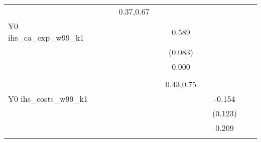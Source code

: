 \begin{table}[!h]
\begin{adjustbox}{width=\columnwidth,center}
\begin{tabular}{l*{8}{c}}
                    &                     &                     &   0.37,0.67         &                     &                     &                     &                     &                     &                     &                     \\
Y0 ihs\_ca\_exp\_w99\_k1&                     &                     &                     &                     &       0.589\sym{***}&                     &                     &                     &                     &                     \\
                    &                     &                     &                     &                     &     (0.083)         &                     &                     &                     &                     &                     \\
                    &                     &                     &                     &                     &       0.000         &                     &                     &                     &                     &                     \\
                    &                     &                     &                     &                     &                     &                     &                     &                     &                     &                     \\
                    &                     &                     &                     &                     &   0.43,0.75         &                     &                     &                     &                     &                     \\
Y0 ihs\_costs\_w99\_k1 &                     &                     &                     &                     &                     &                     &      -0.154         &                     &                     &                     \\
                    &                     &                     &                     &                     &                     &                     &     (0.123)         &                     &                     &                     \\
                    &                     &                     &                     &                     &                     &                     &       0.209         &                     &                     &                     \\
                    &                     &                     &                     &                     &                     &                     &                     &                     &                     &                     \\

\end{tabular}
\end{adjustbox}
\end{table}
